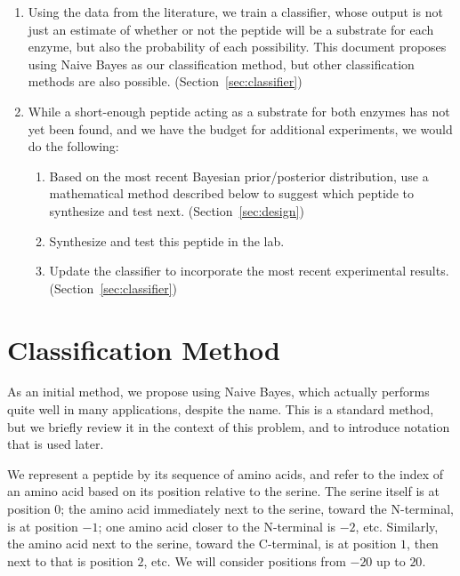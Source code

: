 \documentclass[12pt]{article}
\begin{document}
\begin{enumerate}
\item Using the data from the literature, we train a classifier, whose output is not just an estimate of whether or not the peptide will be a substrate for each enzyme, but also the probability of each possibility.
  This document proposes using Naive Bayes as our classification method, but other classification methods are also possible. (Section~\ref{sec:classifier})
\item While a short-enough peptide acting as a substrate for both enzymes has not yet been found, and we have the budget for additional experiments, we would do the following:
  \begin{enumerate}
    \item Based on the most recent Bayesian prior/posterior distribution, use a mathematical method described below to suggest which peptide to synthesize and test next. (Section~\ref{sec:design})
    \item Synthesize and test this peptide in the lab.
    \item Update the classifier to incorporate the most recent experimental results. (Section~\ref{sec:classifier})
  \end{enumerate}
\end{enumerate}

\section{Classification Method}\label{sec:NB}
\label{sec:classifier}
 
As an initial method, we propose using Naive Bayes, which actually performs quite well in many applications, despite the name.
This is a standard method, but we briefly review it in the context of this problem, and to introduce notation that is used later.

We represent a peptide by its sequence of amino acids, and refer to the index of an amino acid based on its position relative to the serine.  The serine itself is at position 0; 
the amino acid immediately next to the serine, toward the N-terminal, is at position $-1$; one amino acid closer to the N-terminal is $-2$, etc.  Similarly, the amino acid next to the serine, toward the C-terminal, is at position $1$, then next to that is position $2$, etc.
We will consider positions from $-20$ up to $20$.
\end{document}
